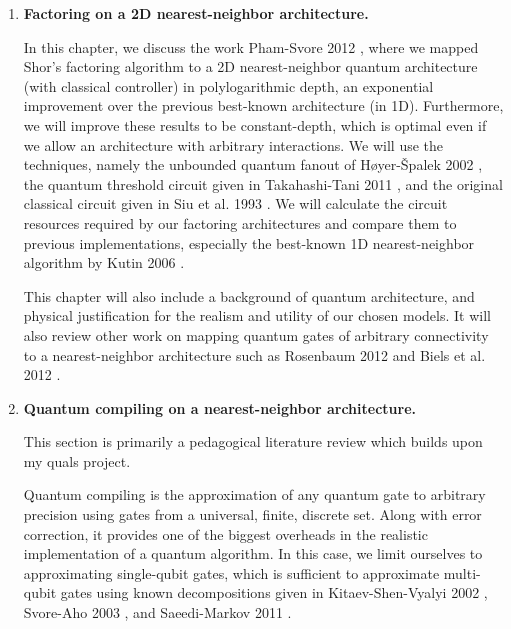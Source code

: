 \documentclass[]{article}
\theoremstyle{plain} \newtheorem{lemma}{Lemma}
\begin{document}
\begin{enumerate}


\item
\textbf{Factoring on a 2D nearest-neighbor architecture.}

In this chapter, we discuss the work
Pham-Svore 2012 \cite{Pham2012}, where we mapped Shor's factoring algorithm
to a 2D nearest-neighbor quantum architecture (with classical controller) in
polylogarithmic depth, an exponential improvement over the previous
best-known architecture (in 1D).
Furthermore, we will improve these
results to be constant-depth, which is optimal even if we allow an
architecture with arbitrary interactions. We will use the techniques,
namely the unbounded quantum fanout of H{\o}yer-{\v S}palek 2002
\cite{Hoyer2002}, the quantum threshold circuit given in
Takahashi-Tani 2011 \cite{Takahashi2011}, and the original classical circuit
given in Siu et al. 1993 \cite{Siu1993}.
We will calculate the circuit resources required by our factoring architectures
and compare them to previous implementations, especially the best-known
1D nearest-neighbor algorithm by Kutin 2006 \cite{Kutin2006}.

This chapter will also include a background of quantum architecture, and
physical justification for the realism and utility of our chosen models.
It will also review other work on mapping quantum gates of
arbitrary connectivity to a nearest-neighbor architecture such as
Rosenbaum 2012 \cite{Rosenbaum2012} and Biels et al. 2012 \cite{Beals2012}.

\pagebreak


\item
\textbf{Quantum compiling on a nearest-neighbor architecture.}

This section is primarily a pedagogical literature review which builds upon my
quals project.

Quantum compiling is the approximation of any quantum gate to arbitrary
precision using gates from a universal, finite, discrete set. Along with
error correction, it provides one of the biggest overheads in the realistic
implementation of a quantum algorithm. In this case,
we limit ourselves to approximating single-qubit gates, which is sufficient
to approximate multi-qubit gates using known decompositions given in
Kitaev-Shen-Vyalyi 2002 \cite{Kitaev2002}, Svore-Aho 2003 \cite{Aho2003},
and Saeedi-Markov 2011 \cite{Saeedi2011}.


\end{enumerate}
\end{document}
